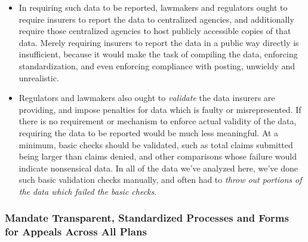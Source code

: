 \documentclass[12pt, a4paper,twoside]{report}
\theoremstyle{plain} %
\theoremstyle{definition} %
\theoremstyle{remark} %
\numberwithin{equation}{chapter}
\begin{document}
\begin{itemize}
			\item In requiring such data to be reported, lawmakers and regulators ought to require insurers to report the data to centralized agencies, and additionally require those centralized agencies to host publicly accessible copies of that data. Merely requiring insurers to report the data in a public way directly is insufficient, because it would make the task of compiling the data, enforcing standardization, and even enforcing compliance with posting, unwieldy and unrealistic.
			
			\item Regulators and lawmakers also ought to \emph{validate} the data insurers are providing, and impose penalties for data which is faulty or misrepresented. If there is no requirement or mechanism to enforce actual validity of the data, requiring the data to be reported would be much less meaningful. At a minimum, basic checks should be validated, such as total claims submitted being larger than claims denied, and other comparisons whose failure would indicate nonsensical data. In all of the data we've analyzed here, we've done such basic validation checks manually, and often had to \emph{throw out portions of the data which failed the basic checks}.
		\end{itemize}
		
		\subsubsection{Mandate Transparent, Standardized Processes and Forms for Appeals Across All Plans}
		
\end{document}
